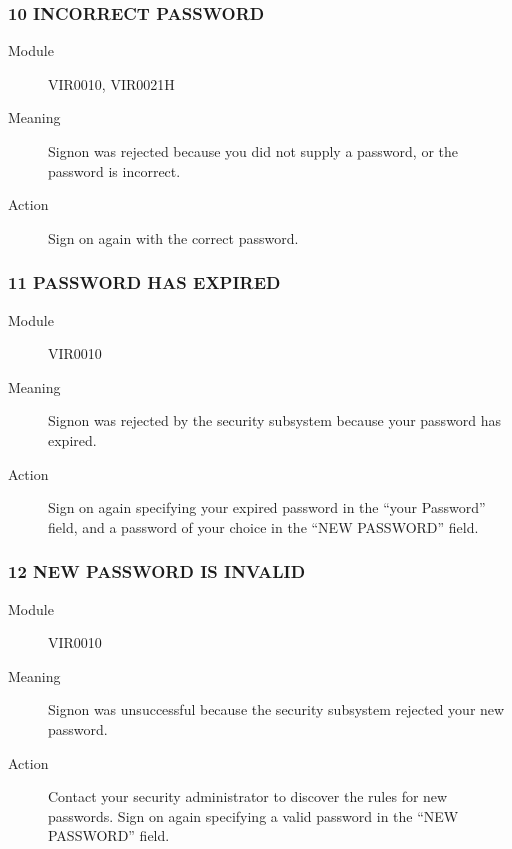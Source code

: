 \documentclass[letterpaper,10pt,english]{sphinxmanual}
\begin{document}
\subsubsection{10 INCORRECT PASSWORD}
\label{\detokenize{messages:incorrect-password}}\begin{description}
\item[{Module}] \leavevmode
VIR0010, VIR0021H

\item[{Meaning}] \leavevmode
Signon was rejected because you did not supply a password, or the password is incorrect.

\item[{Action}] \leavevmode
Sign on again with the correct password.

\end{description}


\subsubsection{11 PASSWORD HAS EXPIRED}
\label{\detokenize{messages:password-has-expired}}\begin{description}
\item[{Module}] \leavevmode
VIR0010

\item[{Meaning}] \leavevmode
Signon was rejected by the security subsystem because your password has expired.

\item[{Action}] \leavevmode
Sign on again specifying your expired password in the “your Password” field, and a password of your choice in the “NEW PASSWORD” field.

\end{description}


\subsubsection{12 NEW PASSWORD IS INVALID}
\label{\detokenize{messages:new-password-is-invalid}}\begin{description}
\item[{Module}] \leavevmode
VIR0010

\item[{Meaning}] \leavevmode
Signon was unsuccessful because the security subsystem rejected your new password.

\item[{Action}] \leavevmode
Contact your security administrator to discover the rules for new passwords. Sign on again specifying a valid password in the “NEW PASSWORD” field.

\end{description}
\end{document}
